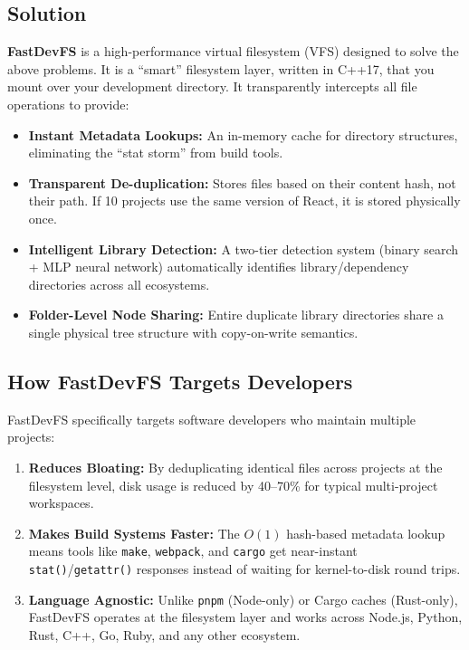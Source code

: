 \documentclass[12pt, a4paper]{article}
\begin{document}
\subsection{Solution}

\textbf{FastDevFS} is a high-performance virtual filesystem (VFS) designed to solve the above problems. It is a ``smart'' filesystem layer, written in C++17, that you mount over your development directory. It transparently intercepts all file operations to provide:

\begin{itemize}
  \item \textbf{Instant Metadata Lookups:} An in-memory cache for directory structures, eliminating the ``stat storm'' from build tools.
  \item \textbf{Transparent De-duplication:} Stores files based on their content hash, not their path. If 10 projects use the same version of React, it is stored physically once.
  \item \textbf{Intelligent Library Detection:} A two-tier detection system (binary search + MLP neural network) automatically identifies library/dependency directories across all ecosystems.
  \item \textbf{Folder-Level Node Sharing:} Entire duplicate library directories share a single physical tree structure with copy-on-write semantics.
\end{itemize}

\subsection{How FastDevFS Targets Developers}

FastDevFS specifically targets software developers who maintain multiple projects:

\begin{enumerate}
  \item \textbf{Reduces Bloating:} By deduplicating identical files across projects at the filesystem level, disk usage is reduced by 40--70\% for typical multi-project workspaces.
  \item \textbf{Makes Build Systems Faster:} The $O(1)$ hash-based metadata lookup means tools like \texttt{make}, \texttt{webpack}, and \texttt{cargo} get near-instant \texttt{stat()}/\texttt{getattr()} responses instead of waiting for kernel-to-disk round trips.
  \item \textbf{Language Agnostic:} Unlike \texttt{pnpm} (Node-only) or Cargo caches (Rust-only), FastDevFS operates at the filesystem layer and works across Node.js, Python, Rust, C++, Go, Ruby, and any other ecosystem.
\end{enumerate}
\end{document}
